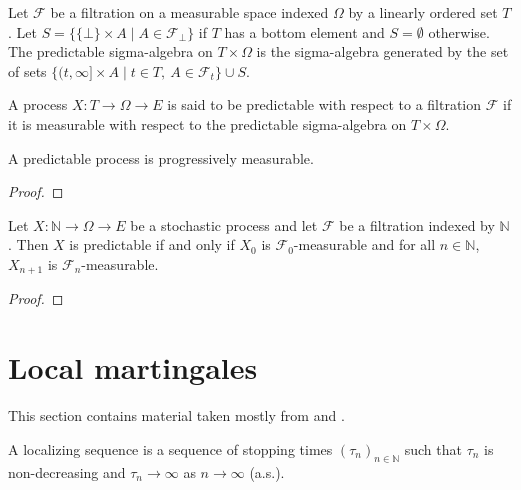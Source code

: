 \begin{definition}\label{def:predictableMeasurableSpace}
Let $\mathcal{F}$ be a filtration on a measurable space indexed $\Omega$ by a linearly ordered set $T$.
Let $S = \{\{\bot\} \times A \mid A \in \mathcal{F}_\bot\}$ if $T$ has a bottom element and $S = \emptyset$ otherwise.
The predictable sigma-algebra on $T \times \Omega$ is the sigma-algebra generated by the set of sets $\{(t, \infty] \times A \mid t \in T, \: A \in \mathcal{F}_t\} \cup S$.
\end{definition}


\begin{definition}\label{def:predictable}
A process $X : T \to \Omega \to E$ is said to be predictable with respect to a filtration $\mathcal{F}$ if it is measurable with respect to the predictable sigma-algebra on $T \times \Omega$.
\end{definition}


\begin{lemma}\label{lem:Predictable.progressive}
A predictable process is progressively measurable.
\end{lemma}

\begin{proof}

\end{proof}


\begin{lemma}\label{lem:predictable_nat_iff}
Let $X : \mathbb{N} \to \Omega \to E$ be a stochastic process and let $\mathcal{F}$ be a filtration indexed by $\mathbb{N}$.
Then $X$ is predictable if and only if $X_0$ is $\mathcal{F}_0$-measurable and for all $n \in \mathbb{N}$, $X_{n+1}$ is $\mathcal{F}_n$-measurable.
\end{lemma}

\begin{proof}

\end{proof}



\section{Local martingales}


This section contains material taken mostly from \cite[Chapters 10 and 18]{kallenberg2021} and \cite{almostsuremath}.


\begin{definition}\label{def:localizingSequence}
  \leanok
A localizing sequence is a sequence of stopping times $(\tau_n)_{n \in \mathbb{N}}$ such that $\tau_n$ is non-decreasing and $\tau_n \to \infty$ as $n \to \infty$ (a.s.).
\end{definition}


